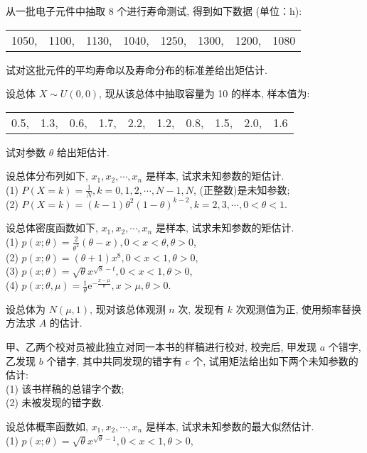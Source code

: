\begin{xiti}
\item 从一批电子元件中抽取 8 个进行寿命测试, 得到如下数据 (单位：h):
\begin{center}
\begin{tabular}{cccccccc}
	1050,&1100,&1130,&1040,&1250,&1300,&1200,&1080
\end{tabular}
\end{center}
试对这批元件的平均寿命以及寿命分布的标准差给出矩估计.
\item 设总体 $X\sim U(0,0)$, 现从该总体中抽取容量为 10 的样本, 样本值为:
\begin{center}
\begin{tabular}{cccccccccc}
0.5,&1.3,&0.6,&1.7,&2.2,&1.2,&0.8,&1.5,&2.0,&1.6
\end{tabular}	
\end{center}
试对参数 $\theta$ 给出矩估计.
\item 设总体分布列如下, $x_1,x_2,\cdots,x_n$ 是样本, 试求未知参数的矩估计.\\
(1) $P(X=k)=\frac{1}{N}, k=0,1,2, \cdots, N-1, N$, (正整数)是未知参数;\\
(2) $P(X=k)=(k-1) \theta^{2}(1-\theta)^{k-2}, k=2,3, \cdots, 0<\theta<1$.
\item 设总体密度函数如下, $x_1,x_2,\cdots,x_n$ 是样本, 试求未知参数的矩估计. \\
(1) $p(x ; \theta)=\frac{2}{\theta^{2}}(\theta-x), 0<x<\theta, \theta>0$, \\
(2) $p(x ; \theta)=(\theta+1) x^{8}, 0<x<1, \theta>0$, \\
(3) $p(x ; \theta)=\sqrt{\theta} x^{\sqrt8-t}, 0<x<1, \theta>0$, \\
(4) $p(x ; \theta, \mu)=\frac{1}{\theta} \mathrm{e}^{-\frac{x-\mu}{\theta}}, x>\mu, \theta>0$.
\item 设总体为 $N(\mu,1)$, 现对该总体观测 $n$ 次, 发现有 $k$ 次观测值为正, 使用频率替换方法求 $A$ 的估计. 
\item 甲、乙两个校对员被此独立对同一本书的样稿进行校对, 校完后, 甲发现 $a$ 个错字, 乙发现 $b$ 个错字, 其中共同发现的错字有 $c$ 个, 试用矩法给出如下两个未知参数的估计:\\
(1) 该书样稿的总错字个数;\\
(2) 未被发现的错字数.
\item 设总体概率函数如, $x_1,x_2,\cdots,x_n$ 是样本, 试求未知参数的最大似然估计. \\
(1) $p(x ; \theta)=\sqrt{\theta} x^{\sqrt{\theta}-1}, 0<x<1, \theta>0$, \\

\end{xiti}
